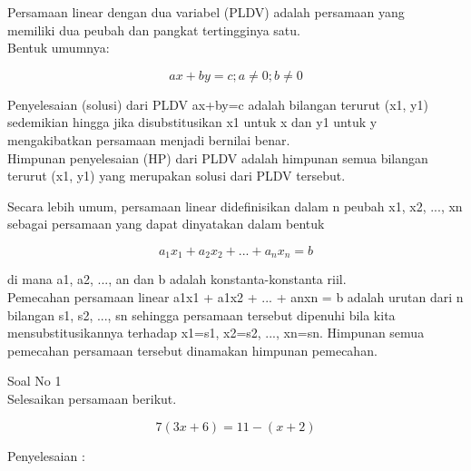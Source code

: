 \begin{eulernotebook}
\begin{eulercomment}
\begin{eulercomment}
\begin{eulercomment}
\end{eulercomment}
\eulersubheading{}
\begin{eulercomment}
Persamaan linear dengan dua variabel (PLDV) adalah persamaan yang\\
memiliki dua peubah dan pangkat tertingginya satu.\\
Bentuk umumnya:

\end{eulercomment}
\begin{eulerformula}
\[
\boxed{ax+by=c; a\neq0; b\neq0}
\]
\end{eulerformula}
\begin{eulercomment}
Penyelesaian (solusi) dari PLDV ax+by=c adalah bilangan terurut (x1,
y1) sedemikian hingga jika disubstitusikan x1 untuk x dan y1 untuk y\\
mengakibatkan persamaan menjadi bernilai benar.\\
Himpunan penyelesaian (HP) dari PLDV adalah himpunan semua bilangan\\
terurut (x1, y1) yang merupakan solusi dari PLDV tersebut.

\end{eulercomment}
\eulersubheading{}
\begin{eulercomment}
Secara lebih umum, persamaan linear didefinisikan dalam n peubah x1,
x2, ..., xn sebagai persamaan yang dapat dinyatakan dalam bentuk

\end{eulercomment}
\begin{eulerformula}
\[
\boxed{a_{1}x_{1}+a_{2}x_{2}+...+a_{n}x_{n}=b}
\]
\end{eulerformula}
\begin{eulercomment}
di mana a1, a2, ..., an dan b adalah konstanta-konstanta riil.\\
Pemecahan persamaan linear a1x1 + a1x2 + ... + anxn = b adalah urutan
dari n bilangan s1, s2, ..., sn sehingga persamaan tersebut dipenuhi
bila kita mensubstitusikannya terhadap x1=s1, x2=s2, ..., xn=sn.
Himpunan semua pemecahan persamaan tersebut dinamakan himpunan
pemecahan.

\end{eulercomment}
\begin{eulercomment}
Soal No 1\\
Selesaikan persamaan berikut.

\end{eulercomment}
\begin{eulerformula}
\[
7(3x+6) = 11-(x+2)
\]
\end{eulerformula}
\begin{eulercomment}
Penyelesaian :


\end{eulercomment}
\end{eulercomment}
\end{eulercomment}
\end{eulernotebook}
